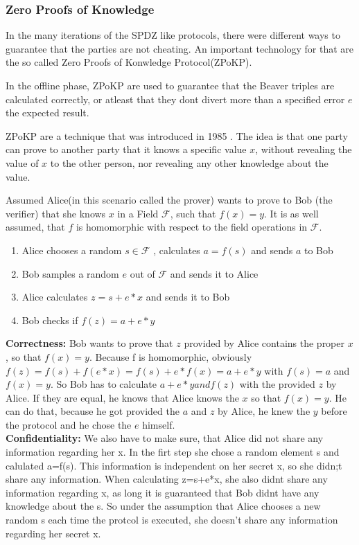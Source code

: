 \documentclass[english,runningheads,a4paper]{llncs}[2018/03/10]
\begin{document}
\subsubsection{Zero Proofs of Knowledge}
In the many iterations of the SPDZ like protocols, there were different ways to guarantee that the parties are not cheating. An important technology for that are the so called Zero Proofs of Konwledge Protocol(ZPoKP).

In the offline phase, ZPoKP are used to guarantee that the Beaver triples are calculated correctly, or atleast that they dont divert more than a specified error \(e\) the expected result.

ZPoKP are a technique that was introduced  in 1985 \cite{Goldwasser:1985:KCI:22145.22178}. The idea is that one party can prove to another party that it knows a specific value \(x\), without revealing the value of \(x\) to the other person, nor revealing any other knowledge about the value. 

Assumed Alice(in this scenario called the prover) wants to prove to Bob (the verifier) that she knows \( x\) in a Field \( \mathcal{F} \), such that \(f(x)=y\). It is as well assumed, that \( f \) is homomorphic with respect to the field operations in  \( \mathcal{F} \).
\begin{enumerate}
\item Alice chooses a random \( s \in \mathcal{F} \) , calculates \( a = f(s)\) and sends \( a\) to Bob
\item Bob samples a random  \( e \) out of  \( \mathcal{F} \) and sends it to Alice
\item Alice calculates \( z=s+e*x\) and sends it to Bob
\item Bob checks if \( f(z)=a+e*y\)
\end{enumerate}

\textbf{Correctness:}
Bob wants to prove that \( z\) provided by Alice contains the proper \( x\), so that \( f(x)=y\). 
Because f is homomorphic, obviously \( f(z)=f(s)+f(e*x)=f(s)+e*f(x)=a+e*y\) with \(f(s)=a\) and \(f(x)=y\).
So Bob has to calculate \( a+e*y and f(z)\) with the provided \( z\) by Alice. If they are equal, he knows that Alice knows the \( x\) so that \( f(x)=y\).
He can do that, because he got provided the \( a\) and \( z\) by Alice, he knew the \( y\) before the protocol and he chose the \( e\) himself.\\

\textbf{Confidentiality:}
We also have to make sure, that Alice did not share any information regarding her x.
In the firt step she chose a random element s and calulated a=f(s). This information is independent on her secret x, so she didn;t share any information.
When calculating z=s+e*x, she also didnt share any information regarding x, as long it is guaranteed that Bob didnt have any knowledge about the s.
So under the assumption that Alice chooses a new random s each time the protcol is executed, she doesn't share any information regarding her secret x.\\
\end{document}
